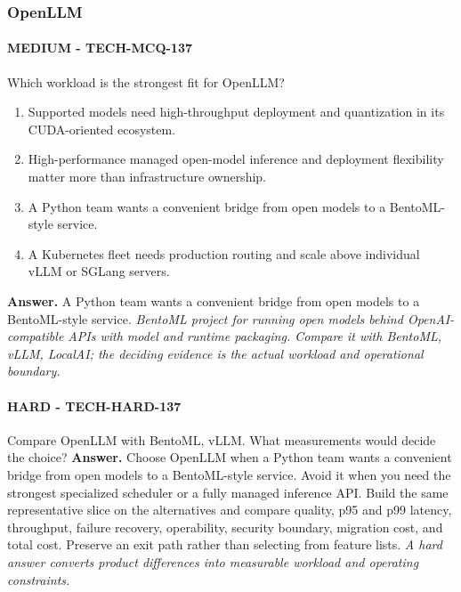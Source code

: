 \subsubsection*{OpenLLM}
\paragraph{MEDIUM - TECH-MCQ-137} Which workload is the strongest fit for OpenLLM?
\begin{enumerate}[label=\Alph*.]
\item Supported models need high-throughput deployment and quantization in its CUDA-oriented ecosystem.
\item High-performance managed open-model inference and deployment flexibility matter more than infrastructure ownership.
\item A Python team wants a convenient bridge from open models to a BentoML-style service.
\item A Kubernetes fleet needs production routing and scale above individual vLLM or SGLang servers.
\end{enumerate}
\textbf{Answer.} A Python team wants a convenient bridge from open models to a BentoML-style service.
\textit{BentoML project for running open models behind OpenAI-compatible APIs with model and runtime packaging. Compare it with BentoML, vLLM, LocalAI; the deciding evidence is the actual workload and operational boundary.}
\paragraph{HARD - TECH-HARD-137} Compare OpenLLM with BentoML, vLLM. What measurements would decide the choice?
\textbf{Answer.} Choose OpenLLM when a Python team wants a convenient bridge from open models to a BentoML-style service. Avoid it when you need the strongest specialized scheduler or a fully managed inference API. Build the same representative slice on the alternatives and compare quality, p95 and p99 latency, throughput, failure recovery, operability, security boundary, migration cost, and total cost. Preserve an exit path rather than selecting from feature lists.
\textit{A hard answer converts product differences into measurable workload and operating constraints.}
